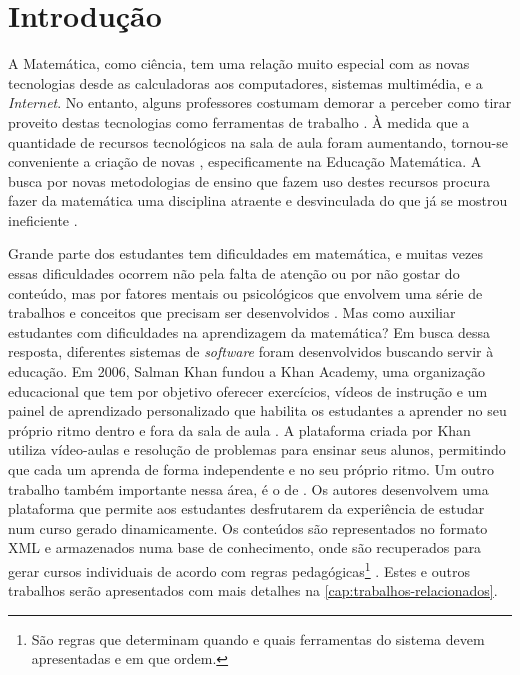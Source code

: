 \chapter{Introdução}
\label{cap:introducao}

A Matemática, como ciência, tem uma relação muito especial com as novas tecnologias desde as calculadoras aos computadores, sistemas multimédia, e a \textit{Internet}. No entanto, 
alguns professores costumam 
demorar a perceber como tirar proveito destas tecnologias como ferramentas de trabalho \cite{da1997ensino}. \`A medida que a quantidade de recursos tecnológicos na sala de aula foram aumentando, 
tornou-se conveniente a criação de novas , especificamente na Educação Matemática. A 
busca por novas metodologias de ensino que fazem uso destes recursos procura fazer da matemática uma disciplina atraente e desvinculada do  que já se mostrou ineficiente 
\cite{silva2009ambiente}.

Grande parte dos estudantes tem dificuldades em  matemática, e muitas vezes essas dificuldades ocorrem não pela falta de atenção ou por não gostar do conteúdo, mas por fatores mentais 
ou psicológicos que envolvem uma série de trabalhos e conceitos que precisam ser desenvolvidos \cite{sa2015software}. Mas como auxiliar estudantes com dificuldades na aprendizagem da matemática? Em 
busca dessa resposta, diferentes sistemas de \textit{software} foram desenvolvidos buscando servir \`a  educação. Em 2006, Salman Khan fundou a Khan Academy, uma organização educacional que tem 
por objetivo oferecer exercícios, vídeos de instrução e um painel de aprendizado personalizado que habilita os estudantes a aprender no seu próprio ritmo dentro e fora da sala de aula 
\cite{khan2012one}. A plataforma criada por Khan utiliza vídeo-aulas e resolução de problemas para ensinar seus alunos, permitindo que cada um aprenda de forma independente e no seu pr\'oprio ritmo. Um outro trabalho também  importante nessa área, \'e o de  . Os autores desenvolvem uma plataforma que permite aos estudantes desfrutarem da experiência de estudar num curso gerado dinamicamente. Os conte\'udos s\~ao representados no formato XML \cite{bray1998extensible} e armazenados numa base de conhecimento, onde s\~ao recuperados para gerar cursos individuais de acordo com regras pedagógicas\footnote{S\~ao regras que determinam quando e quais ferramentas do sistema devem apresentadas e em que ordem.} \cite{melis2004activemath}. Estes e outros trabalhos serão 
apresentados com mais detalhes na \autoref{cap:trabalhos-relacionados}.

